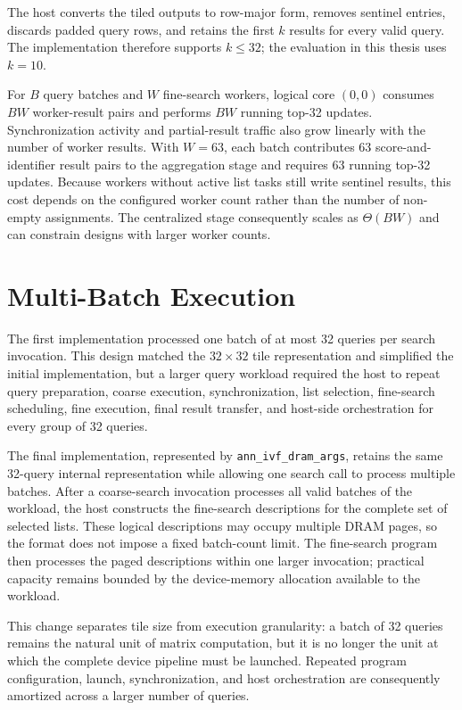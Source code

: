 The host converts the tiled outputs to row-major form, removes sentinel entries, discards padded query rows, and retains the first \(k\) results for every valid query. The implementation therefore supports \(k\leq32\); the evaluation in this thesis uses \(k=10\).

For \(B\) query batches and \(W\) fine-search workers, logical core \((0,0)\) consumes \(BW\) worker-result pairs and performs \(BW\) running top-32 updates. Synchronization activity and partial-result traffic also grow linearly with the number of worker results. With \(W=63\), each batch contributes 63 score-and-identifier result pairs to the aggregation stage and requires 63 running top-32 updates. Because workers without active list tasks still write sentinel results, this cost depends on the configured worker count rather than the number of non-empty assignments. The centralized stage consequently scales as \(\Theta(BW)\) and can constrain designs with larger worker counts.

\section{Multi-Batch Execution}
\label{sec:multi-batch-execution}

The first implementation processed one batch of at most 32 queries per search invocation. This design matched the \(32\times32\) tile representation and simplified the initial implementation, but a larger query workload required the host to repeat query preparation, coarse execution, synchronization, list selection, fine-search scheduling, fine execution, final result transfer, and host-side orchestration for every group of 32 queries.

The final implementation, represented by \texttt{ann\_ivf\_dram\_args}, retains the same 32-query internal representation while allowing one search call to process multiple batches. After a coarse-search invocation processes all valid batches of the workload, the host constructs the fine-search descriptions for the complete set of selected lists. These logical descriptions may occupy multiple DRAM pages, so the format does not impose a fixed batch-count limit. The fine-search program then processes the paged descriptions within one larger invocation; practical capacity remains bounded by the device-memory allocation available to the workload.

This change separates tile size from execution granularity: a batch of 32 queries remains the natural unit of matrix computation, but it is no longer the unit at which the complete device pipeline must be launched. Repeated program configuration, launch, synchronization, and host orchestration are consequently amortized across a larger number of queries.

